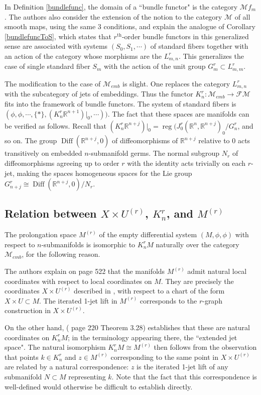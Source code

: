 \documentclass[12pt]{article}
\numberwithin{equation}{section}
\theoremstyle{plain}
\theoremstyle{definition}
\newcommand{\R}{\mathbb{R}}
\newcommand{\M}{\mathcal{M}}
\newcommand{\FM}{\mathcal{FM}}
\newcommand{\ra}{\rightarrow}
\begin{document}
In Definition \ref{bundlefunc}, the domain of a ``bundle functor" is the category $\M f_{m}$. The authors \cite{kms} also consider the extension of the notion to the category $\M$ of all smooth maps, using the same 3 conditions, and explain the analogue of Corollary \ref{bundlefuncToS}, which states that $r^\text{th}$-order bundle functors in this generalized sense are associated with systems $(S_0,S_1,\cdots)$ of standard fibers together with an action of the category whose morphisms are the $L^{r}_{m,n}$. This generalizes the case of single standard fiber $S_m$ with the action of the unit group $G^{r}_{m}\subset L^{r}_{m,m}$.

The modification to the case of $\M_{emb}$ is slight. One replaces the category $L^{r}_{m,n}$ with the subcategory of jets of embeddings. Thus the functor $K^{r}_{n}:\M_{emb}\ra \FM$ fits into the framework of bundle functors. The system of standard fibers is $(\phi,\phi,\cdots,\{*\}, (K^{r}_{n}\R^{n+1})|_{0},\cdots) )$. The fact that these spaces are manifolds can be verified as follows. Recall that $(K^{r}_{n}\R^{n+j})|_{0}= \operatorname{reg}(J^{r}_{0}(\R^{n},\R^{n+j})_{0}/G^{r}_{n}$, and so on. The group $\operatorname{Diff}(\R^{n+j},0)$ of diffeomorphisms of $\R^{n+j}$ relative to $0$ acts transitively on embedded $n$-submanifold germs. The normal subgroup $N_r$ of diffeomorphisms agreeing up to order $r$ with the identity acts trivially on each $r$-jet, making the spaces homogeneous spaces for the Lie group $G^{r}_{n+j}\cong\operatorname{Diff}(\R^{n+j},0)/N_r$.

\subsection{Relation between $X\times U^{(r)}$, $K^{r}_{n}$, and $M^{(r)}$}

The prolongation space $M^{(r)}$ of the empty differential system $(M,\phi,\phi)$ with respect to $n$-submanifolds is isomorphic to $K^{r}_{n}M$ naturally over the category $\mathcal{M}_{emb}$, for the following reason.

The authors \cite{bg} explain on page 522 that the manifolds $M^{(r)}$ admit natural local coordinates with respect to local coordinates on $M$. They are precisely the coordinates $X\times U^{(r)}$ described in \cite{olver}, with respect to a chart of the form $X\times U\subset M$. The iterated 1-jet lift in $M^{(r)}$ corresponds to the $r$-graph construction in $X\times U^{(r)}$.

On the other hand, (\cite{olver} page 220 Theorem 3.28) establishes that these are natural coordinates on $K^{r}_{n}M$; in the terminology appearing there, the ``extended jet space". The natural isomorphism $K^{r}_{n}M\cong M^{(r)}$ then follows from the observation that points $k\in K^{r}_{n}$ and $z\in M^{(r)}$ corresponding to the same point in $X\times U^{(r)}$ are related by a natural correspondence: $z$ is the iterated 1-jet lift of any submanifold $N\subset M$ representing $k$. Note that the fact that this correspondence is well-defined would otherwise be difficult to establish directly.
\end{document}
